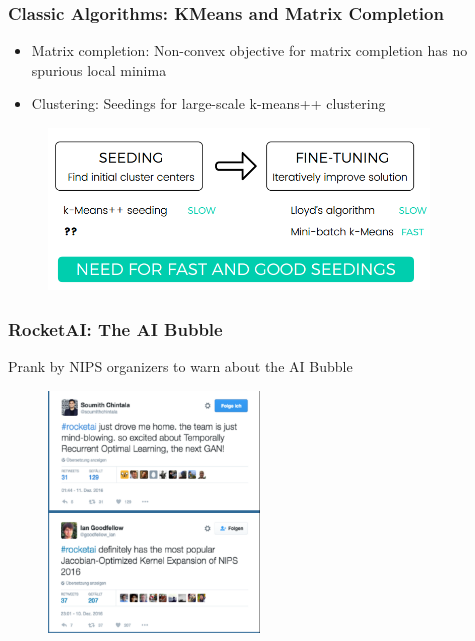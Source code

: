\documentclass[11pt,
               hyperref={colorlinks,citecolor=pink,linkcolor=red,urlcolor=blue}
               ]{beamer}
\begin{document}
  \begin{frame}
    \frametitle{Classic Algorithms: KMeans and Matrix Completion}

    \begin{itemize}
      \item Matrix completion: Non-convex objective for matrix completion has no spurious local minima \footnotemark[1]
      \item Clustering: Seedings for large-scale k-means++ clustering \footnotemark[2]
    \end{itemize}

    \begin{figure}
      \centering
      \includegraphics[width=0.9\textwidth]{kmeans.png}
    \end{figure}

  \end{frame}

  \begin{frame}
    \frametitle{RocketAI: The AI Bubble}

    \centering Prank by NIPS organizers to warn about the AI Bubble

    \begin{figure}
      \centering
      \includegraphics[width=0.5\textwidth]{rocketai2.png}
    \end{figure}

  \end{frame}
\end{document}
